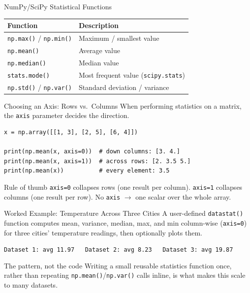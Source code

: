 \documentclass[9pt,aspectratio=169,xcolor=table]{beamer}
\newcommand{\striped}{\rowcolors{1}{white}{stripe}}
\begin{document}
\begin{frame}{NumPy/SciPy Statistical Functions}
    \leavevmode
    \small
    \begin{table}
    \striped
    \begin{tabular}{ll}
        \toprule
        \textbf{Function} & \textbf{Description} \\
        \midrule
        \texttt{np.max()} / \texttt{np.min()} & Maximum / smallest value \\
        \texttt{np.mean()} & Average value \\
        \texttt{np.median()} & Median value \\
        \texttt{stats.mode()} & Most frequent value (\texttt{scipy.stats}) \\
        \texttt{np.std()} / \texttt{np.var()} & Standard deviation / variance \\
        \bottomrule
    \end{tabular}
    \end{table}
\end{frame}

\begin{frame}[fragile]{Choosing an Axis: Rows vs.\ Columns}
    \leavevmode
    When performing statistics on a matrix, the \texttt{axis} parameter
    decides the direction.

\begin{lstlisting}
x = np.array([[1, 3], [2, 5], [6, 4]])

print(np.mean(x, axis=0))  # down columns: [3. 4.]
print(np.mean(x, axis=1))  # across rows: [2. 3.5 5.]
print(np.mean(x))          # every element: 3.5
\end{lstlisting}

    \begin{block}{Rule of thumb}
        \texttt{axis=0} collapses \alert{rows} (one result per column).
        \texttt{axis=1} collapses \alert{columns} (one result per row).
        No \texttt{axis} $\to$ one scalar over the whole array.
    \end{block}
\end{frame}

\begin{frame}{Worked Example: Temperature Across Three Cities}
    \leavevmode
    \small
    A user-defined \texttt{datastat()} function computes mean, variance,
    median, max, and min \alert{column-wise} (\texttt{axis=0}) for three
    cities' temperature readings, then optionally plots them.

    \vspace{2mm}
    \texttt{Dataset 1: avg 11.97\ \ \ Dataset 2: avg 8.23\ \ \ Dataset 3: avg 19.87}

    \vspace{3mm}
    \begin{block}{The pattern, not the code}
        Writing a small reusable statistics function once, rather than
        repeating \texttt{np.mean()}/\texttt{np.var()} calls inline,
        is what makes this scale to many datasets.
    \end{block}
\end{frame}
\end{document}
